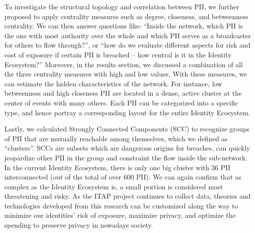 \documentclass[conference]{IEEEtran}
\begin{document}
To investigate the structural topology and correlation between PII, we further proposed to apply centrality measures such as degree, closeness, and betweenness centrality. We can then answer questions like: ``Inside the network, which PII is the one with most authority over the whole and which PII serves as a broadcaster for others to flow through?'', or ``how do we evaluate different aspects for risk and cost of exposure if certain PII is breached --  how central is it in the Identity Ecosystem?'' Moreover, in the results section, we discussed a combination of all the three centrality measures with high and low values. With these measures, we can estimate the hidden characteristics of the network. For instance, low betweenness and high closeness PII are located in a dense, active cluster at the center of events with many others.  Each PII can be categorized into a specific type, and hence portray a corresponding layout for the entire Identity Ecosystem.

Lastly, we calculated Strongly Connected Components (SCC) to recognize groups of PII that are mutually reachable among themselves, which we defined as ``clusters''.  SCCs are subsets which are dangerous origins for breaches, can quickly jeopardize other PII in the group and constraint the flow inside the sub-network. In the current Identity Ecosystem, there is only one big cluster with 36 PII interconnected (out of the total of over 600 PII). We can again confirm  that as complex as the Identity Ecosystem is, a small portion is considered most threatening and risky.  As the ITAP project continues to collect data, theories and technologies developed from this research can be customized along the way to minimize our identities'  risk of exposure, maximize privacy, and optimize the spending to preserve privacy in nowadays society.




%

%



% 
\appendix
\end{document}

